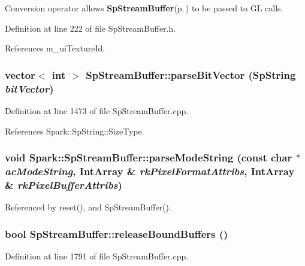 Conversion operator allows {\bf Sp\-Stream\-Buffer}{\rm (p.\,\pageref{classSpark_1_1SpStreamBuffer})} to be passed to GL calls. 

Definition at line 222 of file Sp\-Stream\-Buffer.h.

References m\_\-ui\-Texture\-Id.
\subsubsection{\setlength{\rightskip}{0pt plus 5cm}vector$<$ int $>$ Sp\-Stream\-Buffer::parse\-Bit\-Vector ({\bf Sp\-String} {\em bit\-Vector})\hspace{0.3cm}{\tt  [protected]}}\label{classSpark_1_1SpStreamBuffer_b2}


Definition at line 1473 of file Sp\-Stream\-Buffer.cpp.

References Spark::Sp\-String::Size\-Type.
\subsubsection{\setlength{\rightskip}{0pt plus 5cm}void Spark::Sp\-Stream\-Buffer::parse\-Mode\-String (const char $\ast$ {\em ac\-Mode\-String}, {\bf Int\-Array} \& {\em rk\-Pixel\-Format\-Attribs}, {\bf Int\-Array} \& {\em rk\-Pixel\-Buffer\-Attribs})\hspace{0.3cm}{\tt  [protected]}}\label{classSpark_1_1SpStreamBuffer_b1}




Referenced by reset(), and Sp\-Stream\-Buffer().
\subsubsection{\setlength{\rightskip}{0pt plus 5cm}bool Sp\-Stream\-Buffer::release\-Bound\-Buffers ()\hspace{0.3cm}{\tt  [protected]}}\label{classSpark_1_1SpStreamBuffer_b7}


Definition at line 1791 of file Sp\-Stream\-Buffer.cpp.


